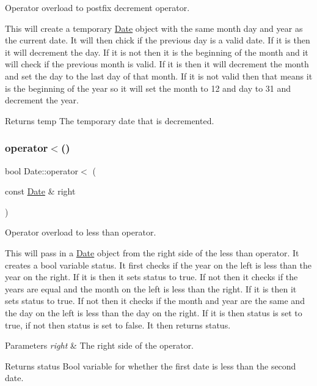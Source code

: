 Operator overload to postfix decrement operator. 

This will create a temporary \mbox{\hyperlink{class_date}{Date}} object with the same month day and year as the current date. It will then chick if the previous day is a valid date. If it is then it will decrement the day. If it is not then it is the beginning of the month and it will check if the previous month is valid. If it is then it will decrement the month and set the day to the last day of that month. If it is not valid then that means it is the beginning of the year so it will set the month to 12 and day to 31 and decrement the year.

\begin{DoxyReturn}{Returns}
temp The temporary date that is decremented. 
\end{DoxyReturn}
\mbox{\label{class_date_ad7637f53eec6eafb2edcfc76c5ef8696}} 
\subsubsection{\texorpdfstring{operator$<$()}{operator<()}}
{\footnotesize\ttfamily bool Date\+::operator$<$ (\begin{DoxyParamCaption}\item[{const \mbox{\hyperlink{class_date}{Date}} \&}]{right }\end{DoxyParamCaption})\hspace{0.3cm}{\ttfamily [inline]}}



Operator overload to less than operator. 

This will pass in a \mbox{\hyperlink{class_date}{Date}} object from the right side of the less than operator. It creates a bool variable {\ttfamily status}. It first checks if the year on the left is less than the year on the right. If it is then it sets {\ttfamily status} to true. If not then it checks if the years are equal and the month on the left is less than the right. If it is then it sets {\ttfamily status} to true. If not then it checks if the month and year are the same and the day on the left is less than the day on the right. If it is then {\ttfamily status} is set to true, if not then {\ttfamily status} is set to false. It then returns {\ttfamily status}.


\begin{DoxyParams}{Parameters}
{\em right} & The right side of the operator.\\
\hline
\end{DoxyParams}
\begin{DoxyReturn}{Returns}
status Bool variable for whether the first date is less than the second date. 
\end{DoxyReturn}
\mbox{\label{class_date_ab672204162beca5eca19c967cac9cd18}} 
